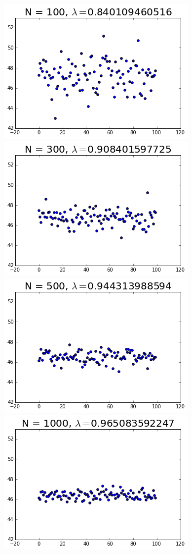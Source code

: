 \documentclass{article}
\begin{document}
	{\centering
		\hspace*{-3.75cm}
		\includegraphics[scale=0.55]{100_scatter}
		\includegraphics[scale=0.55]{300_scatter}
		\hspace*{-3.75cm}
		\vspace*{1.25cm}
		\includegraphics[scale=0.55]{500_scatter}
		\includegraphics[scale=0.55]{1000_scatter}	
}
\end{document}
